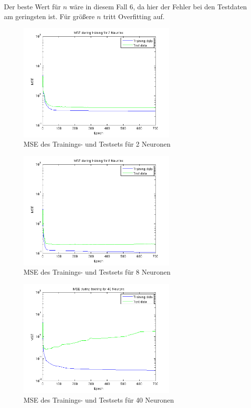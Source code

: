 Der beste Wert für $n$ wäre in diesem Fall 6, da hier der Fehler bei den Testdaten am geringsten ist. Für größere $n$ tritt Overfitting auf.

\begin{figure}[h!]
  \centering
  \includegraphics[width=0.7\textwidth]{./figures/3/3_mse_2.png}
  \caption{MSE des Trainings- und Testsets für 2 Neuronen}
  \label{fig:3_mse_2}
\end{figure}

\begin{figure}[h!]
  \centering
  \includegraphics[width=0.7\textwidth]{./figures/3/3_mse_8.png}
  \caption{MSE des Trainings- und Testsets für 8 Neuronen}
  \label{fig:3_mse_8}
\end{figure}

\begin{figure}[h!]
  \centering
  \includegraphics[width=0.7\textwidth]{./figures/3/3_mse_40.png}
  \caption{MSE des Trainings- und Testsets für 40 Neuronen}
  \label{fig:3_mse_40}
\end{figure}

